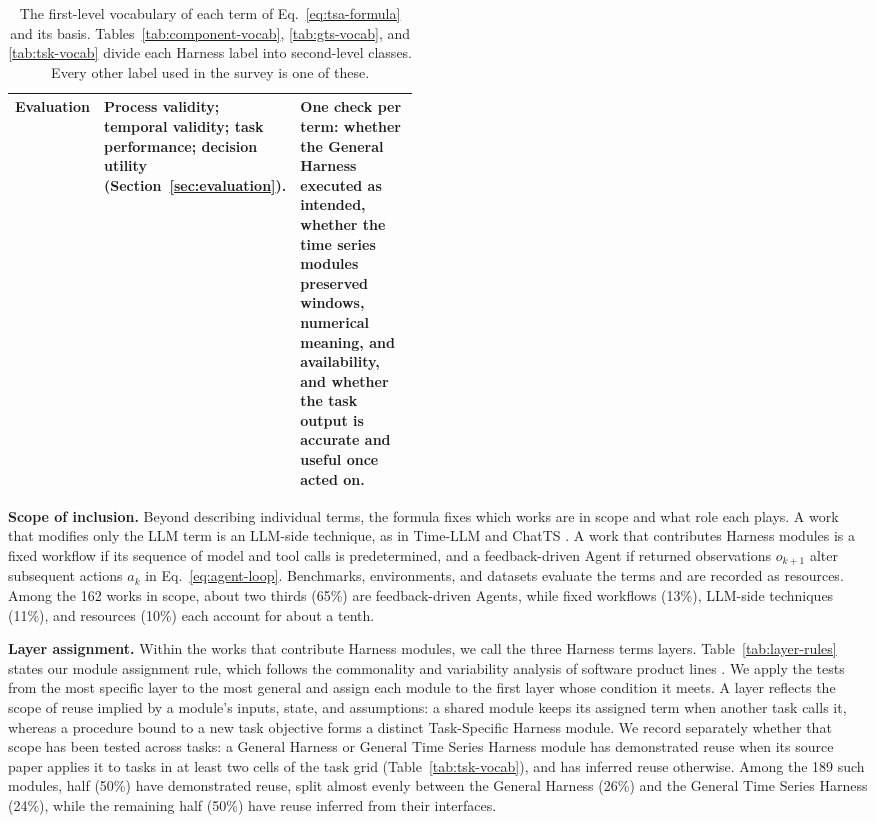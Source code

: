 \documentclass[preprints,article,submit,moreauthors]{Definitions/mdpi}
\begin{document}
\begin{table}[t]
\begin{tabularx}{\linewidth}{@{}>{\raggedright\arraybackslash}p{0.17\linewidth}>{\raggedright\arraybackslash}p{0.30\linewidth}>{\raggedright\arraybackslash}X@{}}
Evaluation & Process validity; temporal validity; task performance; decision utility (Section~\ref{sec:evaluation}). & One check per term: whether the General Harness executed as intended, whether the time series modules preserved windows, numerical meaning, and availability, and whether the task output is accurate and useful once acted on.\\
\bottomrule
\end{tabularx}
\caption{The first-level vocabulary of each term of Eq.~\eqref{eq:tsa-formula} and its basis. Tables~\ref{tab:component-vocab}, \ref{tab:gts-vocab}, and \ref{tab:tsk-vocab} divide each Harness label into second-level classes. Every other label used in the survey is one of these.}
\label{tab:term-basis}
\end{table}

\noindent\textbf{Scope of inclusion.} Beyond describing individual terms, the formula fixes which works are in scope and what role each plays. A work that modifies only the LLM term is an LLM-side technique, as in Time-LLM \citep{jin2024timellm} and ChatTS \citep{chatts2025}. A work that contributes Harness modules is a fixed workflow if its sequence of model and tool calls is predetermined, and a feedback-driven Agent if returned observations $o_{k+1}$ alter subsequent actions $a_k$ in Eq.~\eqref{eq:agent-loop}. Benchmarks, environments, and datasets evaluate the terms and are recorded as resources. Among the 162 works in scope, about two thirds (65\%) are feedback-driven Agents, while fixed workflows (13\%), LLM-side techniques (11\%), and resources (10\%) each account for about a tenth.

\noindent\textbf{Layer assignment.} Within the works that contribute Harness modules, we call the three Harness terms layers. Table~\ref{tab:layer-rules} states our module assignment rule, which follows the commonality and variability analysis of software product lines \citep{kang1990foda,clements2001spl}. We apply the tests from the most specific layer to the most general and assign each module to the first layer whose condition it meets. A layer reflects the scope of reuse implied by a module's inputs, state, and assumptions: a shared module keeps its assigned term when another task calls it, whereas a procedure bound to a new task objective forms a distinct Task-Specific Harness module. We record separately whether that scope has been tested across tasks: a General Harness or General Time Series Harness module has demonstrated reuse when its source paper applies it to tasks in at least two cells of the task grid (Table~\ref{tab:tsk-vocab}), and has inferred reuse otherwise. Among the 189 such modules, half (50\%) have demonstrated reuse, split almost evenly between the General Harness (26\%) and the General Time Series Harness (24\%), while the remaining half (50\%) have reuse inferred from their interfaces.
\end{document}
